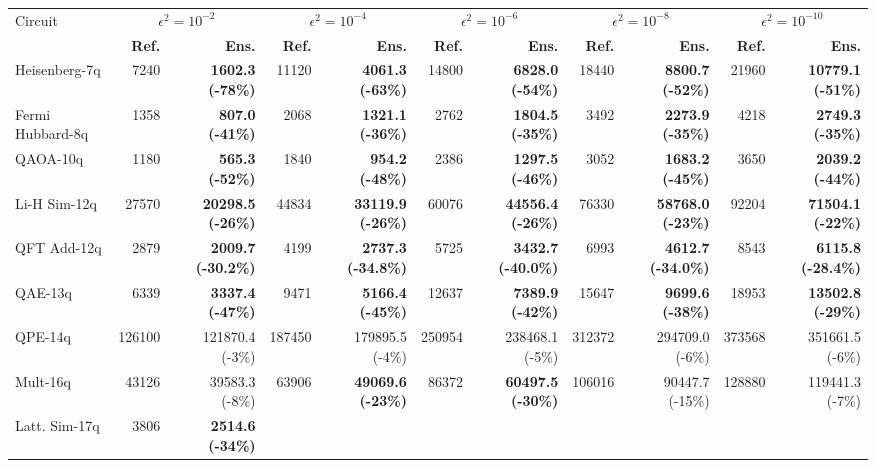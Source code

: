 \begin{table}[t]
\setlength{\tabcolsep}{5pt}
\centering
\scriptsize
\begin{tabular}{|l|r | r|r | r|r | r|r | r|r | r|}
\hline
\multirow{2}{*}{Circuit} 
& \multicolumn{2}{c|}{$\epsilon^2 = 10^{-2}$} 
& \multicolumn{2}{c|}{$\epsilon^2 = 10^{-4}$} 
& \multicolumn{2}{c|}{$\epsilon^2 = 10^{-6}$} 
& \multicolumn{2}{c|}{$\epsilon^2 = 10^{-8}$} 
& \multicolumn{2}{c|}{$\epsilon^2 = 10^{-10}$} \\
\cline{2-11}
& \textbf{Ref.} & \textbf{Ens.} & \textbf{Ref.} & \textbf{Ens.} & \textbf{Ref.} & \textbf{Ens.} & \textbf{Ref.} & \textbf{Ens.} & \textbf{Ref.} & \textbf{Ens.} \\
\hline
Heisenberg-7q 
& 7240 & \textbf{1602.3 (-78\%)} 
& 11120 & \textbf{4061.3 (-63\%)} 
& 14800 & \textbf{6828.0 (-54\%)} 
& 18440 & \textbf{8800.7 (-52\%)} 
& 21960 & \textbf{10779.1 (-51\%)} \\
\hline
Fermi Hubbard-8q 
& 1358 & \textbf{807.0 (-41\%)} 
& 2068 & \textbf{1321.1 (-36\%)} 
& 2762 & \textbf{1804.5 (-35\%)} 
& 3492 & \textbf{2273.9 (-35\%)} 
& 4218 & \textbf{2749.3 (-35\%)} \\
\hline
QAOA-10q 
& 1180 & \textbf{565.3 (-52\%)} 
& 1840 & \textbf{954.2 (-48\%)} 
& 2386 & \textbf{1297.5 (-46\%)} 
& 3052 & \textbf{1683.2 (-45\%)} 
& 3650 & \textbf{2039.2 (-44\%)} \\
\hline
Li-H Sim-12q 
& 27570 & \textbf{20298.5 (-26\%)} 
& 44834 & \textbf{33119.9 (-26\%)} 
& 60076 & \textbf{44556.4 (-26\%)} 
& 76330 & \textbf{58768.0 (-23\%)} 
& 92204 & \textbf{71504.1 (-22\%)} \\
\hline
QFT Add-12q 
& 2879 & \textbf{2009.7 (-30.2\%)} 
& 4199 & \textbf{2737.3 (-34.8\%)} 
& 5725 & \textbf{3432.7 (-40.0\%)} 
& 6993 & \textbf{4612.7 (-34.0\%)} 
& 8543 & \textbf{6115.8 (-28.4\%)} \\
\hline
QAE-13q 
& 6339 & \textbf{3337.4 (-47\%)} 
& 9471 & \textbf{5166.4 (-45\%)} 
& 12637 & \textbf{7389.9 (-42\%)} 
& 15647 & \textbf{9699.6 (-38\%)} 
& 18953 & \textbf{13502.8 (-29\%)} \\
\hline
QPE-14q 
& 126100 & 121870.4 (-3\%) 
& 187450 & 179895.5 (-4\%) 
& 250954 & 238468.1 (-5\%) 
& 312372 & 294709.0 (-6\%) 
& 373568 & 351661.5 (-6\%) \\
\hline
Mult-16q 
& 43126 & 39583.3 (-8\%) 
& 63906 & \textbf{49069.6 (-23\%)} 
& 86372 & \textbf{60497.5 (-30\%)} 
& 106016 & 90447.7 (-15\%)
& 128880 & 119441.3 (-7\%) \\
\hline
Latt. Sim-17q 
& 3806 & \textbf{2514.6 (-34\%)} 

\end{tabular}
\end{table}
